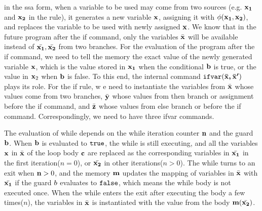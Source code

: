 {{in the ssa form, when a variable to be used may come from two sources (e.g. ${\boldsymbol{\mathbf{x_1}}}$ and ${\boldsymbol{\mathbf{x_2}}}$ in the rule), it generates a new variable ${\boldsymbol{\mathbf{x}}}$, assigning it with $\phi({\boldsymbol{\mathbf{x_1}}}, {\boldsymbol{\mathbf{x_2}}})$,  and replaces the variable to be used with newly assigned ${\boldsymbol{\mathbf{x}}}$. 
We know that in the future program after the if command, 
only the variables $\bar{{\boldsymbol{\mathbf{x}}}}$ will be available instead of $\bar{{\boldsymbol{\mathbf{x_1}}}}, \bar{{\boldsymbol{\mathbf{x_2}}}}$ from two branches.
For the evaluation of the program after the if command, we need to tell the memory the exact value of the newly generated variable ${\boldsymbol{\mathbf{x}}}$, which is the value stored in ${\boldsymbol{\mathbf{x_1}}}$ when the conditional ${\boldsymbol{\mathbf{b}}}$ is true, 
or the value in ${\boldsymbol{\mathbf{x}}}_2$ when ${\boldsymbol{\mathbf{b}}}$ is false. To this end, the internal command $\mathtt{ifvar}({\boldsymbol{\mathbf{\bar{x}, \bar{x}'}}})$ plays its role. 
For the if rule, w
e need to instantiate the variables from $\bar{{\boldsymbol{\mathbf{x}}}}$ whose values come from two branches, 
$\bar{{\boldsymbol{\mathbf{y}}}}$ whose values from then branch or assignment before the if command, and $\bar{{\boldsymbol{\mathbf{z}}}}$ whose values from else branch or before the if command. 
Correspondingly, we need to have three ifvar commands.   
}

{
  The evaluation of while depends on the while iteration counter ${\boldsymbol{\mathbf{n}}}$ and the guard ${\boldsymbol{\mathbf{b}}}$. 
  When ${\boldsymbol{\mathbf{b}}}$ is evaluated to $\mathtt{true}$, the while is still executing, and all the variables ${\boldsymbol{\mathbf{x}}}$ in $\bar{{\boldsymbol{\mathbf{x}}}}$ of the loop body ${\boldsymbol{\mathbf{c}}}$ are replaced as the corresponding variables in $\bar{{\boldsymbol{\mathbf{x_1}}}}$ in the first iteration($n=0$), or $\bar{{\boldsymbol{\mathbf{x_2}}}}$ in other iterations($n > 0$). 
  The while turns to an exit when ${\boldsymbol{\mathbf{n}}} > 0$, 
  and the memory ${\boldsymbol{\mathbf{m}}}$ updates the mapping of variables in $\bar{{\boldsymbol{\mathbf{x}}}}$ with $\bar{{\boldsymbol{\mathbf{x_1}}}}$ if the guard $b$ evaluates to $\mathtt{false}$, 
  which means the while body is not executed once. 
  When the while enters the exit after executing the body a few times($n$), the variables in $\bar{{\boldsymbol{\mathbf{x}}}}$ is instantiated with the value from the body ${\boldsymbol{\mathbf{m}}}(\bar{{\boldsymbol{\mathbf{x_2}}}})$. 
}
%
%
}
